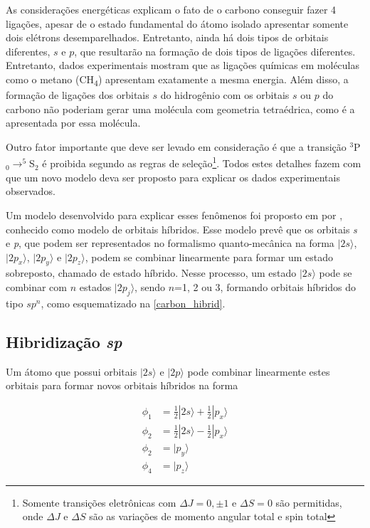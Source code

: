 	As considerações energéticas explicam o fato de o carbono conseguir fazer 4 ligações, apesar de o estado fundamental do átomo isolado apresentar somente dois elétrons desemparelhados. Entretanto, ainda há dois tipos de orbitais diferentes, $s$ e $p$, que resultarão na formação de dois tipos de ligações diferentes. Entretanto, dados experimentais mostram que as ligações químicas em moléculas como o metano (CH\textsubscript{4}) apresentam exatamente a mesma energia. Além disso, a formação de ligações dos orbitais $s$ do hidrogênio com os orbitais $s$ ou $p$ do carbono não poderiam gerar uma molécula com geometria tetraédrica, como é a apresentada por essa molécula.
	
	Outro fator importante que deve ser levado em consideração é que a transição $^3$P$_0 \rightarrow ^5$S$_2$ é proibida segundo as regras de seleção\footnote{Somente transições eletrônicas com $\Delta J = 0, \pm 1$ e $\Delta S = 0$ são permitidas, onde $\Delta J$ e $\Delta S$ são as variações de momento angular total e spin total}. Todos estes detalhes fazem com que um novo modelo deva ser proposto para explicar os dados experimentais observados.
	
	Um modelo desenvolvido para explicar esses fenômenos foi proposto em \citeyear{pauling1931nature} por \citeauthor{pauling1931nature}, conhecido como modelo de orbitais híbridos. Esse modelo prevê que os orbitais \textit{s} e \textit{p}, que podem ser representados no formalismo quanto-mecânica na forma $|2s\rangle$, $|2p_x\rangle$, $|2p_y\rangle$ e $|2p_z\rangle$, podem se combinar linearmente para formar um estado sobreposto, chamado de estado híbrido. Nesse processo, um estado $|2s\rangle$ pode se combinar com $n$ estados $|2p_j\rangle$, sendo $n$=1, 2 ou 3, formando orbitais híbridos do tipo $sp^n$, como esquematizado na \autoref{carbon_hibrid}.
	
	\subsection{Hibridização \textit{sp}}
	
		Um átomo que possui orbitais $|2s\rangle$ e $|2p\rangle$ pode combinar linearmente estes orbitais para formar novos orbitais híbridos na forma
		
		\begin{subequations}
			\label{sp1hibrid}
			\begin{flalign}
			\phi_1& = \frac{1}{2}|2s\rangle + \frac{1}{2}|p_x\rangle\\
			\phi_2& = \frac{1}{2}|2s\rangle - \frac{1}{2}|p_x\rangle\\
			\phi_2& = |p_y\rangle \\
			\phi_4& = |p_z\rangle
			\end{flalign}
		\end{subequations}
	
